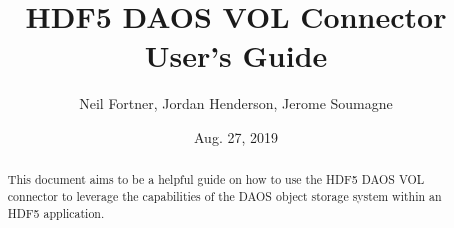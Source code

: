 \documentclass[letterpaper,hyper]{THG_Guide}
\title{HDF5 DAOS VOL Connector User's Guide}
\author{Neil Fortner, Jordan Henderson, Jerome Soumagne}
\date{Aug. 27, 2019}
\begin{document}
\maketitle

\begin{abstract}
This document aims to be a helpful guide on how to use the HDF5 DAOS VOL connector to leverage the capabilities of the DAOS object storage system within an HDF5 application.
\end{abstract}


\makerevisions

\tableofcontents
\newpage


\end{document}
